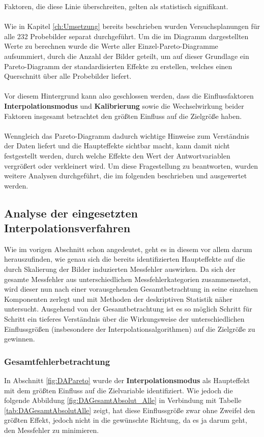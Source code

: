 \documentclass[
fontsize=10pt, 
listof = totoc,
parskip = half	
]{report}
\begin{document}
\noindent Faktoren, die diese Linie überschreiten, gelten als statistisch signifikant. 
\\\\
Wie in Kapitel \ref{ch:Umsetzung} bereits beschrieben wurden Versuchsplanungen für alle 232 Probebilder separat durchgeführt. Um die im Diagramm dargestellten Werte zu berechnen wurde die Werte aller Einzel-Pareto-Diagramme aufsummiert, durch die Anzahl der Bilder geteilt, um auf dieser Grundlage ein Pareto-Diagramm der standardisierten Effekte zu erstellen, welches einen Querschnitt über  alle Probebilder liefert.
\\\\
\noindent Vor diesem Hintergrund kann also geschlossen werden, dass die Einflussfaktoren \textbf{Interpolationsmodus} und \textbf{Kalibrierung} sowie die Wechselwirkung beider Faktoren insgesamt betrachtet den größten Einfluss auf die Zielgröße haben.
\\\\
\noindent Wenngleich das Pareto-Diagramm dadurch wichtige Hinweise zum Verständnis der Daten liefert und die Haupteffekte sichtbar macht, kann damit nicht festgestellt werden, durch welche Effekte den Wert der Antwortvariablen vergrößert oder verkleinert wird. Um diese Fragestellung zu beantworten, wurden weitere Analysen durchgeführt, die im folgenden beschrieben und ausgewertet werden.


\subsection{Analyse der eingesetzten Interpolationsverfahren}

Wie im vorigen Abschnitt schon angedeutet, geht es in diesem vor allem darum herauszufinden, wie genau sich die bereits identifizierten Haupteffekte auf die durch Skalierung der Bilder induzierten Messfehler auswirken. Da sich der gesamte Messfehler aus unterschiedlichen Messfehlerkategorien zusammensetzt, wird dieser nun nach einer vorausgehenden Gesamtbetrachtung in seine einzelnen Komponenten zerlegt und mit Methoden der deskriptiven Statistik näher untersucht. Ausgehend von der Gesamtbetrachtung ist es so möglich Schritt für Schritt ein tieferes Verständnis über die Wirkungsweise der unterschiedlichen Einflussgrößen (insbesondere der Interpolationsalgorithmen) auf die Zielgröße zu gewinnen.

\subsubsection{Gesamtfehlerbetrachtung}
\label{subsubsec:AuswertungGesamtfehlerbetrachtung}
 In Abschnitt \ref{fig:DAPareto} wurde der \textbf{Interpolationsmodus} als Haupteffekt mit dem größten Einfluss auf die Zielvariable identifiziert. Wie jedoch die folgende Abbildung \ref{fig:DAGesamtAbsolut_Alle} in Verbindung mit Tabelle \ref{tab:DAGesamtAbsolutAlle} zeigt, hat diese Einflussgröße zwar ohne Zweifel den größten Effekt, jedoch nicht in die gewünschte Richtung, da es ja darum geht, den Messfehler zu minimieren. 
\end{document}
